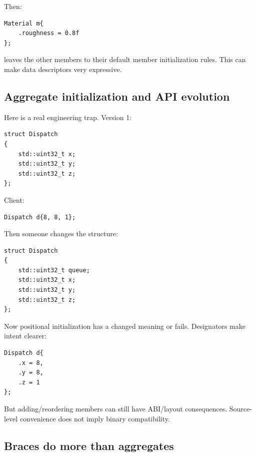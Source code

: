 Then:

\begin{verbatim}
Material m{
    .roughness = 0.8f
};
\end{verbatim}

leaves the other members to their default member initialization rules. This can make data descriptors very expressive.

\subsection{Aggregate initialization and API evolution}\label{05-engine-i-ch003-aggregate-initialization-and-api-evolution}

\hypertarget{05-engine-i-ch003-aggregate-initialization-and-api-evolution}{}

Here is a real engineering trap. Version 1:

\begin{verbatim}
struct Dispatch
{
    std::uint32_t x;
    std::uint32_t y;
    std::uint32_t z;
};
\end{verbatim}

Client:

\begin{verbatim}
Dispatch d{8, 8, 1};
\end{verbatim}

Then someone changes the structure:

\begin{verbatim}
struct Dispatch
{
    std::uint32_t queue;
    std::uint32_t x;
    std::uint32_t y;
    std::uint32_t z;
};
\end{verbatim}

Now positional initialization has a changed meaning or fails. Designators make intent clearer:

\begin{verbatim}
Dispatch d{
    .x = 8,
    .y = 8,
    .z = 1
};
\end{verbatim}

But adding/reordering members can still have ABI/layout consequences. Source-level convenience does not imply binary compatibility.

\subsection{Braces do more than aggregates}\label{05-engine-i-ch003-braces-do-more-than-aggregates}

\hypertarget{05-engine-i-ch003-braces-do-more-than-aggregates}{}

